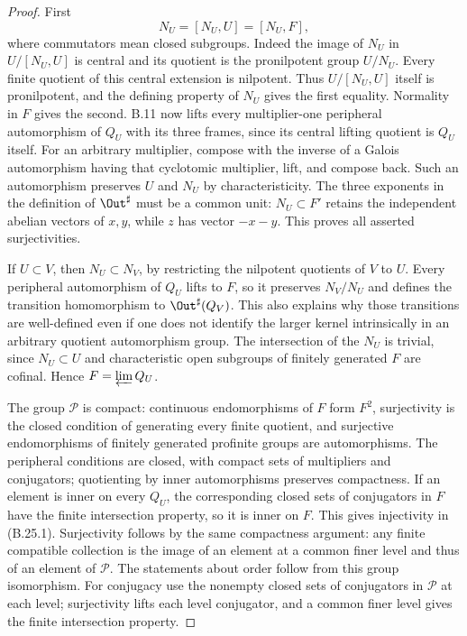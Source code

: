 \begin{proof}
First
\[
                    N_U=[N_U,U]=[N_U,F],
 \tag{B.25.3}
\]
where commutators mean closed subgroups. Indeed the image of
$N_U$ in $U/[N_U,U]$ is central and its quotient is the
pronilpotent group $U/N_U$. Every finite quotient of this
central extension is nilpotent. Thus $U/[N_U,U]$ itself is
pronilpotent, and the defining property of $N_U$ gives the
first equality. Normality in $F$ gives the second.
B.11 now lifts every multiplier-one peripheral automorphism
of $Q_U$ with its three frames, since its central lifting
quotient is $Q_U$ itself. For an arbitrary multiplier, compose
with the inverse of a Galois automorphism having that
cyclotomic multiplier, lift, and compose back. Such an
automorphism preserves $U$ and $N_U$ by characteristicity.
The three exponents in the definition of $\Out^\sharp$ must
be a common unit: $N_U\subset F'$ retains the independent
abelian vectors of $x,y$, while $z$ has vector $-x-y$.
This proves all asserted surjectivities.

If $U\subset V$, then $N_U\subset N_V$, by restricting the
nilpotent quotients of $V$ to $U$. Every peripheral automorphism
of $Q_U$ lifts to $F$, so it preserves $N_V/N_U$ and defines
the transition homomorphism to $\Out^\sharp(Q_V)$. This also
explains why those transitions are well-defined even if one
does not identify the larger kernel intrinsically in an
arbitrary quotient automorphism group.
The intersection of the $N_U$ is trivial, since $N_U\subset U$
and characteristic open subgroups of finitely generated $F$
are cofinal. Hence $F=\varprojlim Q_U$.

The group $\mathcal P$ is compact: continuous endomorphisms
of $F$ form $F^2$, surjectivity is the closed condition of
generating every finite quotient, and surjective endomorphisms
of finitely generated profinite groups are automorphisms.
The peripheral conditions are closed, with compact sets of
multipliers and conjugators; quotienting by inner automorphisms
preserves compactness. If an element is inner on every $Q_U$,
the corresponding closed sets of conjugators in $F$ have the
finite intersection property, so it is inner on $F$. This gives
injectivity in (B.25.1). Surjectivity follows by the same
compactness argument: any finite compatible collection is the
image of an element at a common finer level and thus of an
element of $\mathcal P$. The statements about order follow
from this group isomorphism. For conjugacy use the nonempty
closed sets of conjugators in $\mathcal P$ at each level;
surjectivity lifts each level conjugator, and a common finer
level gives the finite intersection property.


\end{proof}
